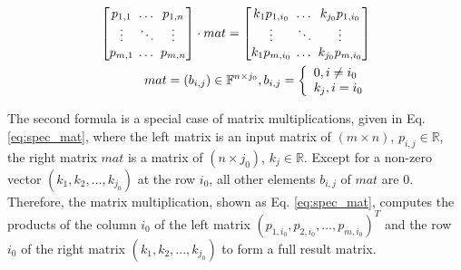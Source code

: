 \begin{equation}
    \label{eq:spec_mat}
    \begin{aligned}
        \setlength{\arraycolsep}{2pt}
        \begin{bmatrix} 
            p_{1, 1}    & \dots     & p_{1, n}  \\
            \vdots      & \ddots    & \vdots    \\
            p_{m, 1}    & \dots     & p_{m, n} 
        \end{bmatrix}
        \cdot
        mat
        =
        \begin{bmatrix}
            k_1 p_{1, i_0}  & \dots     & k_{j_0} p_{1, i_0}    \\
            \vdots          & \ddots    & \vdots                \\
            k_1 p_{m, i_0}  & \dots     & k_{j_0} p_{m, i_0}    \\
        \end{bmatrix} \\
        mat = (b_{i, j}) \in \mathbb{F}^{n \times j_0}, 
        b_{i, j} = \left\{
                        \begin{array}{lc}
                            0, i \neq i_{0} \\
                            k_j, i = i_{0}
                        \end{array}
                    \right.
    \end{aligned}
    \end{equation}

The second formula is a special case of matrix multiplications, given in Eq. \ref{eq:spec_mat}, where the left matrix is an input matrix of $(m \times n)$, $p_{i, j} \in \mathbb{R}$, the right matrix $mat$ is a matrix of $(n \times j_0)$, $k_{j} \in \mathbb{R}$. Except for a non-zero vector $(k_1, k_2, \dots, k_{j_0})$ at the row $i_0$, all other elements $b_{i, j}$ of $mat$ are $0$. Therefore, the matrix multiplication, shown as Eq. \ref{eq:spec_mat}, computes the products of the column $i_0$ of the left matrix $(p_{1, i_0}, p_{2, i_0}, ..., p_{m, i_0})^{T}$ and the row $i_0$ of the right matrix $(k_1, k_2, ..., k_{j_0})$ to form a full result matrix.

